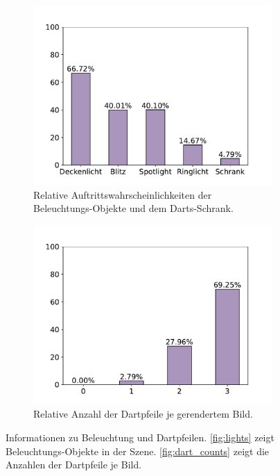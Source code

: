 \begin{figure}
    \centering
    \begin{subfigure}[b]{0.475\textwidth}
        \centering
        \includegraphics[width=\textwidth]{imgs/rendering/ergebnisse/lights_bar_chart.pdf}
        \caption{Relative Auftrittswahrscheinlichkeiten der Beleuchtungs-Objekte und dem Darts-Schrank.}
        \label{fig:lights}
    \end{subfigure}
    \hfill
    \begin{subfigure}{0.475\textwidth}
        \centering
        \includegraphics[width=\textwidth]{imgs/rendering/ergebnisse/dart_counts.pdf}
        \caption{Relative Anzahl der Dartpfeile je gerendertem Bild.}
        \label{fig:dart_counts}
    \end{subfigure}
    \caption{Informationen zu Beleuchtung und Dartpfeilen. \autoref{fig:lights} zeigt Beleuchtungs-Objekte in der Szene. \autoref{fig:dart_counts} zeigt die Anzahlen der Dartpfeile je Bild.}
    \label{img:light_dart_meta}
\end{figure}

